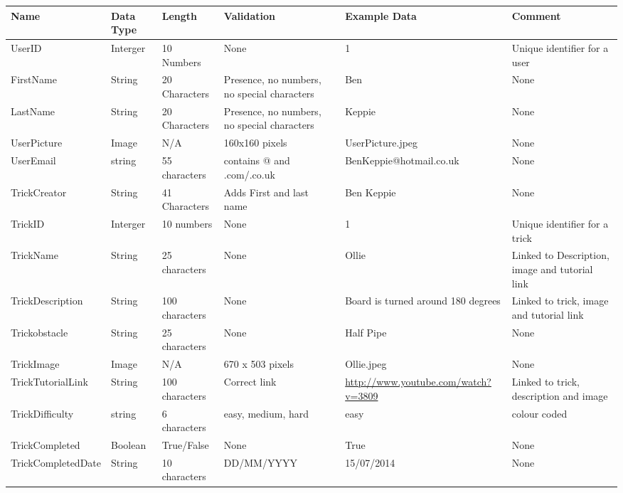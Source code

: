 \begin{landscape}
\begin{center}
\begin{tabular}{|p{3cm}|p{2cm}|p{2.5cm}|p{2cm}|p{3cm}|p{3cm}|}
    \hline
 \textbf{Name} & \textbf{Data Type} & \textbf{Length} & \textbf{Validation} & \textbf{Example Data} & \textbf{Comment} \\ \hline
UserID & Interger & 10 Numbers & None & 1 & Unique identifier for a user \\ \hline
FirstName & String & 20 Characters & Presence, no numbers, no special characters & Ben & None \\ \hline
LastName & String & 20 Characters & Presence, no numbers, no special characters & Keppie & None \\ \hline
UserPicture  & Image & N/A & 160x160 pixels & UserPicture.jpeg & None  \\ \hline
UserEmail & string & 55 characters & contains @ and .com/.co.uk & BenKeppie@hotmail.co.uk & None   \\ \hline

TrickCreator & String & 41 Characters & Adds First and last name & Ben Keppie & None \\ \hline 
TrickID & Interger & 10 numbers & None & 1 & Unique identifier for a trick \\ \hline
TrickName & String & 25 characters & None & Ollie & Linked to Description, image and tutorial link \\ \hline
TrickDescription  & String & 100 characters & None & Board is turned around 180 degrees & Linked to trick, image and tutorial link \\ \hline
Trickobstacle & String & 25 characters & None & Half Pipe & None \\ \hline
TrickImage & Image & N/A & 670 x 503 pixels & Ollie.jpeg & None \\ \hline
TrickTutorialLink  & String & 100 characters & Correct link & \url {http://www.youtube.com/watch?v=3809} & Linked to trick, description and image \\ \hline
TrickDifficulty & string & 6 characters & easy, medium, hard & easy & colour coded \\ \hline
TrickCompleted & Boolean & True/False & None & True & None \\ \hline
TrickCompletedDate & String & 10 characters &  DD/MM/YYYY & 15/07/2014 & None \\ \hline








\end{tabular}
\end{center}
\end{landscape}
